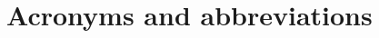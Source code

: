 \newpage
\section{Acronyms and abbreviations}
\label{sec:Acronyms and abbreviations}
\begin{acronym}
\setlength{\itemsep}{-\parsep}
\end{acronym}
